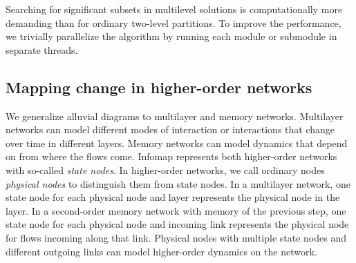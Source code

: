 \documentclass[aps,rmp,floats,floatfix,twocolumn,superscriptaddress,final]{revtex4-2}
\begin{document}
Searching for significant subsets in multilevel solutions is computationally more demanding than for ordinary two-level partitions.
To improve the performance, we trivially parallelize the algorithm by running each module or submodule in separate threads.


\subsection*{Mapping change in higher-order networks}

We generalize alluvial diagrams to multilayer and memory networks.
Multilayer networks can model different modes of interaction or interactions that change over time in different layers.
Memory networks can model dynamics that depend on from where the flows come.
Infomap represents both higher-order networks with so-called \emph{state nodes}.\cite{edler2017mapping}
In higher-order networks, we call ordinary nodes \emph{physical nodes} to distinguish them from state nodes.
In a multilayer network, one state node for each physical node and layer represents the physical node in the layer.\cite{de2015identifying}
In a second-order memory network with memory of the previous step, one state node for each physical node and incoming link represents the physical node for flows incoming along that link.\cite{rosvall2014memory}
Physical nodes with multiple state nodes and different outgoing links can model higher-order dynamics on the network.
\end{document}
